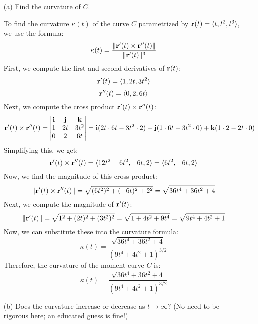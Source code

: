\documentclass[reqno, 12pt]{amsart}
\begin{document}
\begin{itemize}
    \begin{itemize}
      \item[(a)] Find the curvature of $C$.
        \newline
        \begin{answerbox}
          To find the curvature \( \kappa(t) \) of the curve \( C \) parametrized by \( {\bf r}(t) = \langle t, t^2, t^3 \rangle \), we use the formula:
          \[
            \kappa(t) = \frac{\|{\bf r}'(t) \times {\bf r}''(t)\|}{\|{\bf r}'(t)\|^3}
          \]
          First, we compute the first and second derivatives of \( {\bf r}(t) \):
          \[
            {\bf r}'(t) = \langle 1, 2t, 3t^2 \rangle
          \]
          \[
            {\bf r}''(t) = \langle 0, 2, 6t \rangle
          \]
          Next, we compute the cross product \( {\bf r}'(t) \times {\bf r}''(t) \):
          \[
            {\bf r}'(t) \times {\bf r}''(t) =
            \begin{vmatrix}
              \mathbf{i} & \mathbf{j} & \mathbf{k} \\
              1 & 2t & 3t^2 \\
              0 & 2 & 6t
            \end{vmatrix} = \mathbf{i}(2t \cdot 6t - 3t^2 \cdot 2) - \mathbf{j}(1 \cdot 6t - 3t^2 \cdot 0) + \mathbf{k}(1 \cdot 2 - 2t \cdot 0)
          \]
          Simplifying this, we get:
          \[
            {\bf r}'(t) \times {\bf r}''(t) = \langle 12t^2 - 6t^2, -6t, 2 \rangle = \langle 6t^2, -6t, 2 \rangle
          \]
          Now, we find the magnitude of this cross product:
          \[
            \|{\bf r}'(t) \times {\bf r}''(t)\| = \sqrt{(6t^2)^2 + (-6t)^2 + 2^2} = \sqrt{36t^4 + 36t^2 + 4}
          \]
          Next, we compute the magnitude of \( {\bf r}'(t) \):
          \[
            \|{\bf r}'(t)\| = \sqrt{1^2 + (2t)^2 + (3t^2)^2} = \sqrt{1 + 4t^2 + 9t^4} = \sqrt{9t^4 + 4t^2 + 1}
          \]
          Now, we can substitute these into the curvature formula:
          \[
            \kappa(t) = \frac{\sqrt{36t^4 + 36t^2 + 4}}{(9t^4 + 4t^2 + 1)^{3/2}}
          \]
          Therefore, the curvature of the moment curve \( C \) is:
          \[
            \kappa(t) = \frac{\sqrt{36t^4 + 36t^2 + 4}}{(9t^4 + 4t^2 + 1)^{3/2}}
          \]

        \end{answerbox}

        \vspace{0.5 in}
      \item[(b)] Does the curvature increase or decrease as $t \rightarrow \infty$? (No need to be rigorous here; an educated guess is fine!)
        \newline


\end{itemize}
\end{itemize}
\end{document}
